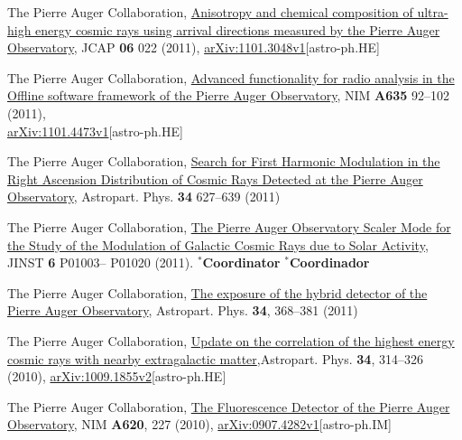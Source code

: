 \begin{etaremune}
\item {}The Pierre Auger Collaboration,
\href{http://dx.doi.org/10.1088/1475-7516/2011/06/022}{{Anisotropy and
chemical composition of ultra-high energy cosmic rays using arrival directions
measured by the Pierre Auger Observatory}}, JCAP {\bf 06} 022 (2011),
\href{http://arxiv.org/abs/1106.3048}{arXiv:1101.3048v1}[astro-ph.HE]

\item {}The Pierre Auger Collaboration,
\href{http://dx.doi.org/10.1016/j.nima.2011.01.049}{{{Advanced
functionality for radio analysis in the Offline software framework of the
Pierre Auger Observatory}}}, NIM {\bf A635} 92--102
(2011),\\
\href{http://arxiv.org/abs/1101.4473}{arXiv:1101.4473v1}[astro-ph.HE]

\item {}The Pierre Auger Collaboration,
\href{http://dx.doi.org/10.1016/j.astropartphys.2010.12.007}{{Search for
First Harmonic Modulation in the Right Ascension Distribution of Cosmic Rays
Detected at the Pierre Auger Observatory}}, Astropart. Phys. {\bf 34} 627--639
(2011)

\item {}The Pierre Auger Collaboration,
\href{http://dx.doi.org/10.1088/1748-0221/6/01/P01003}{{The Pierre Auger
Observatory Scaler Mode for the Study of the Modulation of Galactic Cosmic Rays
due to Solar Activity}}, JINST {\bf 6} P01003--
P01020 (2011). \ifeng $^*${\bf{Coordinator}} \else $^*${\bf{Coordinador}} \fi

\item {}The Pierre Auger Collaboration,
\href{http://dx.doi.org/10.1016/j.astropartphys.2010.10.001}{{The exposure
of the hybrid detector of the Pierre Auger Observatory}}, Astropart. Phys. {\bf
34}, 368--381 (2011)

\item {}The Pierre Auger Collaboration,
\href{http://dx.doi.org/10.1016/j.astropartphys.2010.08.010}{{Update on
the correlation of the highest energy cosmic rays with nearby extragalactic
matter}},Astropart. Phys. {\bf 34}, 314--326 (2010),
\href{http://arxiv.org/abs/1009.1855}{arXiv:1009.1855v2}[astro-ph.HE]

\item {}The Pierre Auger Collaboration,
\href{http://dx.doi.org/10.1016/j.nima.2010.04.023}{{The Fluorescence
Detector of the Pierre Auger Observatory}}, NIM {\bf A620}, 227 (2010),
\href{http://arxiv.org/abs/0907.4282}{arXiv:0907.4282v1}[astro-ph.IM]


\end{etaremune}

